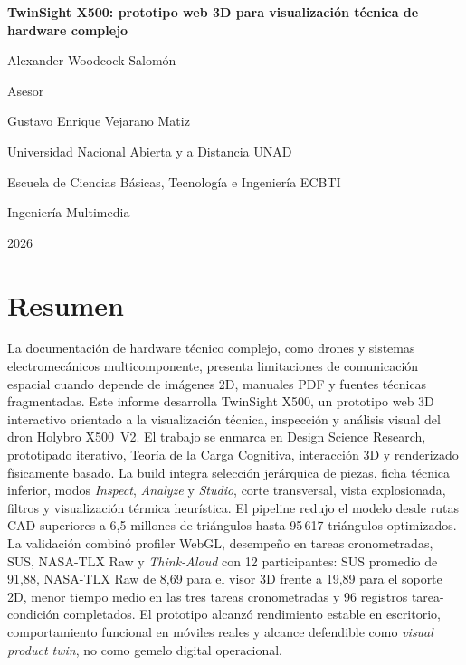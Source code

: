 \documentclass[12pt,letterpaper]{article}
\begin{document}
\thispagestyle{fancy}
\begin{center}
    {\normalfont\bfseries TwinSight X500: prototipo web 3D para visualización técnica de hardware complejo\par}
    \vfill
    {\normalfont Alexander Woodcock Salomón\par}
    \vspace{2\baselineskip}
    {\normalfont Asesor\par
    Gustavo Enrique Vejarano Matiz\par}
    \vfill
    {\normalfont Universidad Nacional Abierta y a Distancia UNAD\par
    Escuela de Ciencias Básicas, Tecnología e Ingeniería ECBTI\par
    Ingeniería Multimedia\par
    2026\par}
\end{center}

\section*{Resumen}
\setlength{\parindent}{0pt}
La documentación de hardware técnico complejo, como drones y sistemas electromecánicos multicomponente, presenta limitaciones de comunicación espacial cuando depende de imágenes 2D, manuales PDF y fuentes técnicas fragmentadas. Este informe desarrolla TwinSight X500, un prototipo web 3D interactivo orientado a la visualización técnica, inspección y análisis visual del dron Holybro X500~V2. El trabajo se enmarca en Design Science Research, prototipado iterativo, Teoría de la Carga Cognitiva, interacción 3D y renderizado físicamente basado. La build integra selección jerárquica de piezas, ficha técnica inferior, modos \textit{Inspect}, \textit{Analyze} y \textit{Studio}, corte transversal, vista explosionada, filtros y visualización térmica heurística. El pipeline redujo el modelo desde rutas CAD superiores a 6,5 millones de triángulos hasta 95\,617 triángulos optimizados. La validación combinó profiler WebGL, desempeño en tareas cronometradas, SUS, NASA-TLX Raw y \textit{Think-Aloud} con 12 participantes: SUS promedio de 91,88, NASA-TLX Raw de 8,69 para el visor 3D frente a 19,89 para el soporte 2D, menor tiempo medio en las tres tareas cronometradas y 96 registros tarea-condición completados. El prototipo alcanzó rendimiento estable en escritorio, comportamiento funcional en móviles reales y alcance defendible como \textit{visual product twin}, no como gemelo digital operacional.
\end{document}
